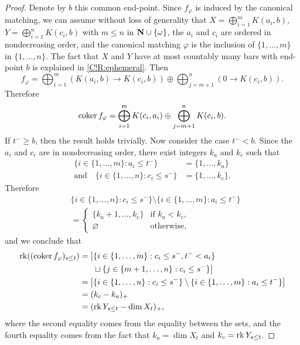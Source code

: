 \begin{proof}
  Denote by $b$ this common end-point. Since $f_\varphi$ is induced by the canonical matching, we can assume without loss of generality that $X = \bigoplus_{i = 1}^m K(a_i, b)$, $Y = \bigoplus_{i = 1}^n K(c_i, b)$ with $m \leq n$ in $\mathbf{N} \cup \{\omega\}$, the $a_i$ and $c_i$ are ordered in nondecreasing order, and the canonical matching $\varphi$ is the inclusion of $\{1, \ldots, m\}$ in $\{1, \ldots, n\}$. The fact that $X$ and $Y$ have at most countably many bars with end-point $b$ is explained in \cref{C!R:ephemeral}. Then
  \[
    f_\varphi = \bigoplus_{i = 1}^m (K(a_i, b) \to K(c_i, b)) \oplus \bigoplus_{j = m + 1}^n (0 \to K(c_i, b)).
  \]
  Therefore
  \[
    \operatorname{coker} f_\varphi = \bigoplus_{i = 1}^m K(c_i, a_i) \oplus \bigoplus_{j = m + 1}^n K(c_i, b).
  \]
  If $t^- \geq b$, then the result holds trivially.
  Now consider the case $t^- < b$. Since the $a_i$ and $c_i$ are in nondecreasing order, there exist integers $k_a$ and $k_c$ such that
  \begin{align*}
    \{i \in \{1, \ldots, m\} : a_i \leq t^-\} & = \{1, \ldots, k_a\} \\
    \text{and} \quad \{i \in \{1, \ldots, n\} : c_i \leq s^-\} & = \{1, \ldots, k_c\}.
  \end{align*}
  Therefore
  \begin{align*}
    & \{i \in \{1, \ldots, n\} : c_i \leq s^-\} \setminus \{i \in \{1, \ldots, m\} : a_i \leq t^-\} \\
    & = \begin{cases}
      \{k_a + 1, \ldots, k_c\} & \text{if } k_a < k_c, \\
      \varnothing & \text{otherwise},
    \end{cases}
  \end{align*}
  and we conclude that
  \begin{align*}
    \operatorname{rk}((\operatorname{coker} f_\varphi)_{s \leq t}) = {} & \big|\{i \in \{1, \ldots, m\} : c_i \leq s^-, t^- < a_i\} \\
    & \hphantom{\big|} \sqcup \{j \in \{m + 1, \ldots, n\} : c_i \leq s^-\} \big| \\
    = {} & \big| \{i \in \{1, \ldots, n\} : c_i \leq s^-\} \setminus \{i \in \{1, \ldots, m\} : a_i \leq t^-\} \big| \\
    = {} & (k_c - k_a)_+ \\
    = {} & (\operatorname{rk} Y_{s \leq t} - \dim X_t)_+,
  \end{align*}
  where the second equality comes from the equality between the sets, and the fourth equality comes from the fact that $k_a = \dim X_t$ and $k_c = \operatorname{rk} Y_{s \leq t}$.
\end{proof}

